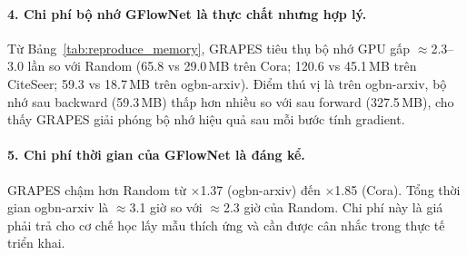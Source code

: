 \paragraph{4. Chi phí bộ nhớ GFlowNet là thực chất nhưng hợp lý.}
Từ Bảng~\ref{tab:reproduce_memory}, GRAPES tiêu thụ bộ nhớ GPU gấp $\approx$2.3--3.0 lần so với Random (65.8 vs 29.0\,MB trên Cora; 120.6 vs 45.1\,MB trên CiteSeer; 59.3 vs 18.7\,MB trên ogbn-arxiv). Điểm thú vị là trên ogbn-arxiv, bộ nhớ sau backward (59.3\,MB) thấp hơn nhiều so với sau forward (327.5\,MB), cho thấy GRAPES giải phóng bộ nhớ hiệu quả sau mỗi bước tính gradient.

\paragraph{5. Chi phí thời gian của GFlowNet là đáng kể.}
GRAPES chậm hơn Random từ $\times$1.37 (ogbn-arxiv) đến $\times$1.85 (Cora). Tổng thời gian ogbn-arxiv là $\approx$3.1 giờ so với $\approx$2.3 giờ của Random. Chi phí này là giá phải trả cho cơ chế học lấy mẫu thích ứng và cần được cân nhắc trong thực tế triển khai.
